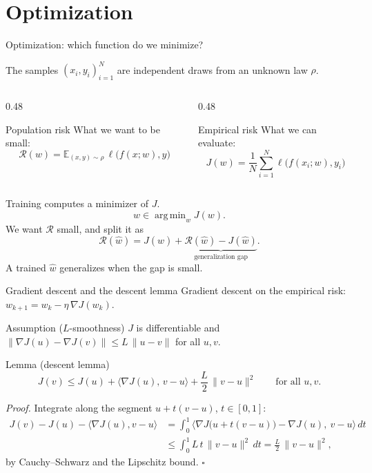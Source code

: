 \documentclass[10pt]{beamer}
\newcommand{\E}{\mathbb{E}}
\newcommand{\Risk}{\mathcal{R}}    %
\DeclareMathOperator*{\argmin}{arg\,min}
\begin{document}
\section{Optimization}

\begin{frame}{Optimization: which function do we minimize?}

The samples $(x_i,y_i)_{i=1}^N$ are independent draws from an unknown law $\rho$. 
\begin{columns}[T, onlytextwidth]
\begin{column}{0.48\textwidth}
\begin{mathbox}[equal height group=risks]{Population risk}
What we want to be small:
\[
\Risk(w)=\E_{(x,y)\sim\rho}\,\ell\big(f(x;w),y\big)
\]
\end{mathbox}
\end{column}
\begin{column}{0.48\textwidth}
\begin{mathbox}[equal height group=risks]{Empirical risk}
What we can evaluate:
\[
J(w)=\frac1N\sum_{i=1}^{N}\ell\big(f(x_i;w),y_i\big)
\]
\end{mathbox}
\end{column}
\end{columns}

\medskip
Training computes a minimizer of $J$.
\[
\hat w\in\argmin_{w}J(w).
\]
We want $\Risk$ small, and split it as
\[
\Risk(\hat w)=J(\hat w)+\underbrace{\Risk(\hat w)-J(\hat w)}_{\text{generalization gap}}.
\]
A trained $\hat w$ \alert{generalizes} when the gap is small.
\end{frame}


\begin{frame}{Gradient descent and the descent lemma}
\small
Gradient descent on the empirical risk: $w_{k+1}=w_k-\eta\,\nabla J(w_k)$.
\begin{mathbox}[assumption]{Assumption ($L$-smoothness)}
$J$ is differentiable and $\|\nabla J(u)-\nabla J(v)\|\le L\,\|u-v\|$ for all $u,v$.
\end{mathbox}
\begin{mathbox}{Lemma (descent lemma)}
\[
J(v)\le J(u)+\langle\nabla J(u),\,v-u\rangle+\frac L2\,\|v-u\|^2\qquad\text{for all }u,v.
\]
\end{mathbox}
\emph{Proof.} Integrate along the segment $u+t(v-u)$, $t\in[0,1]$:
\[
\begin{aligned}
J(v)-J(u)-\langle\nabla J(u),v-u\rangle&=\int_0^1\big\langle\nabla J\big(u+t(v-u)\big)-\nabla J(u),\ v-u\big\rangle\,dt\\
&\le\int_0^1L\,t\,\|v-u\|^2\,dt=\frac L2\,\|v-u\|^2,
\end{aligned}
\]
by Cauchy--Schwarz and the Lipschitz bound. \hfill$\square$
\end{frame}
\end{document}
